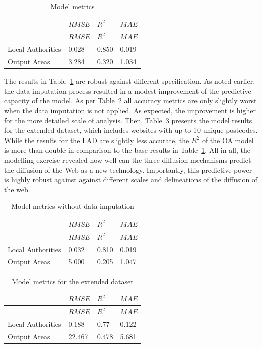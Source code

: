 \documentclass[
  authoryear,
  preprint,
  3p]{elsarticle}
\begin{document}
\begin{longtable}[]{@{}llll@{}}
\caption{Model metrics}\label{tbl-model-metrics}\tabularnewline
\toprule\noalign{}
& \(RMSE\) & \(R^{2}\) & \(MAE\) \\
\midrule\noalign{}
\endfirsthead
\toprule\noalign{}
& \(RMSE\) & \(R^{2}\) & \(MAE\) \\
\midrule\noalign{}
\endhead
\bottomrule\noalign{}
\endlastfoot
Local Authorities & 0.028 & 0.850 & 0.019 \\
Output Areas & 3.284 & 0.320 & 1.034 \\
\end{longtable}

The results in Table~\ref{tbl-model-metrics} are robust against
different specification. As noted earlier, the data imputation process
resulted in a modest improvement of the predictive capacity of the
model. As per Table~\ref{tbl-model-metrics-no-correction} all accuracy
metrics are only slightly worst when the data imputation is not applied.
As expected, the improvement is higher for the more detailed scale of
analysis. Then, Table~\ref{tbl-model-metrics-10} presents the model
results for the extended dataset, which includes websites with up to 10
unique postcodes. While the results for the LAD are slightly less
accurate, the \(R^{2}\) of the OA model is more than double in
comparison to the base results in Table~\ref{tbl-model-metrics}. All in
all, the modelling exercise revealed how well can the three diffusion
mechanisms predict the diffusion of the Web as a new technology.
Importantly, this predictive power is highly robust against against
different scales and delineations of the diffusion of the web.

\begin{longtable}[]{@{}llll@{}}
\caption{Model metrics without data
imputation}\label{tbl-model-metrics-no-correction}\tabularnewline
\toprule\noalign{}
& \(RMSE\) & \(R^{2}\) & \(MAE\) \\
\midrule\noalign{}
\endfirsthead
\toprule\noalign{}
& \(RMSE\) & \(R^{2}\) & \(MAE\) \\
\midrule\noalign{}
\endhead
\bottomrule\noalign{}
\endlastfoot
Local Authorities & 0.032 & 0.810 & 0.019 \\
Output Areas & 5.000 & 0.205 & 1.047 \\
\end{longtable}

\begin{longtable}[]{@{}llll@{}}
\caption{Model metrics for the extended
dataset}\label{tbl-model-metrics-10}\tabularnewline
\toprule\noalign{}
& \(RMSE\) & \(R^{2}\) & \(MAE\) \\
\midrule\noalign{}
\endfirsthead
\toprule\noalign{}
& \(RMSE\) & \(R^{2}\) & \(MAE\) \\
\midrule\noalign{}
\endhead
\bottomrule\noalign{}
\endlastfoot
Local Authorities & 0.188 & 0.77 & 0.122 \\
Output Areas & 22.467 & 0.478 & 5.681 \\
\end{longtable}
\end{document}
